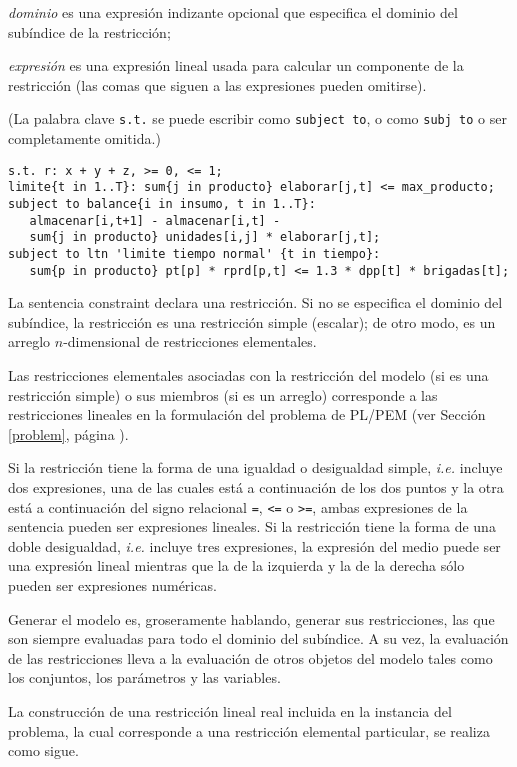 \documentclass[11pt,spanish]{report}
\def\para#1{\noindent{\bf#1}}
\begin{document}
\noindent
{\it dominio} es una expresión indizante opcional que especifica el dominio del subíndice de la restricción;

\noindent
{\it expresión} es una expresión lineal usada para calcular un componente de la restricción (las comas que siguen a las expresiones pueden omitirse).

\noindent
(La palabra clave {\tt s.t.} se puede escribir como {\tt subject to}, o como {\tt subj to} o ser completamente omitida.)

\para{Ejemplos}

\begin{verbatim}
s.t. r: x + y + z, >= 0, <= 1;
limite{t in 1..T}: sum{j in producto} elaborar[j,t] <= max_producto;
subject to balance{i in insumo, t in 1..T}:
   almacenar[i,t+1] - almacenar[i,t] -
   sum{j in producto} unidades[i,j] * elaborar[j,t];
subject to ltn 'limite tiempo normal' {t in tiempo}:
   sum{p in producto} pt[p] * rprd[p,t] <= 1.3 * dpp[t] * brigadas[t];
\end{verbatim}

La sentencia constraint declara una restricción. Si no se especifica el dominio del subíndice, la restricción es una restricción simple (escalar); de otro modo, es un arreglo $n$-dimensional de restricciones elementales.

Las restricciones elementales asociadas con la restricción del modelo (si es una restricción simple) o sus miembros (si es un arreglo) corresponde a las restricciones lineales en la formulación del problema de PL/PEM (ver Sección \ref{problem}, página \pageref{problem}).

Si la restricción tiene la forma de una igualdad o desigualdad simple, {\it i.e.} incluye dos expresiones, una de las cuales está a continuación de los dos puntos y la otra está a continuación del signo relacional {\tt=}, {\tt<=} o {\tt>=}, ambas expresiones de la sentencia pueden ser expresiones lineales. Si la restricción tiene la forma de una doble desigualdad, {\it i.e.} incluye tres expresiones, la expresión del medio puede ser una expresión lineal mientras que la de la izquierda y la de la derecha sólo pueden ser expresiones numéricas.

Generar el modelo es, groseramente hablando, generar sus restricciones, las que son siempre evaluadas para todo el dominio del subíndice. A su vez, la evaluación de las restricciones lleva a la evaluación de otros objetos del modelo tales como los conjuntos, los parámetros y las variables.

La construcción de una restricción lineal real incluida en la instancia del problema, la cual corresponde a una restricción elemental particular, se realiza como sigue.
\end{document}
